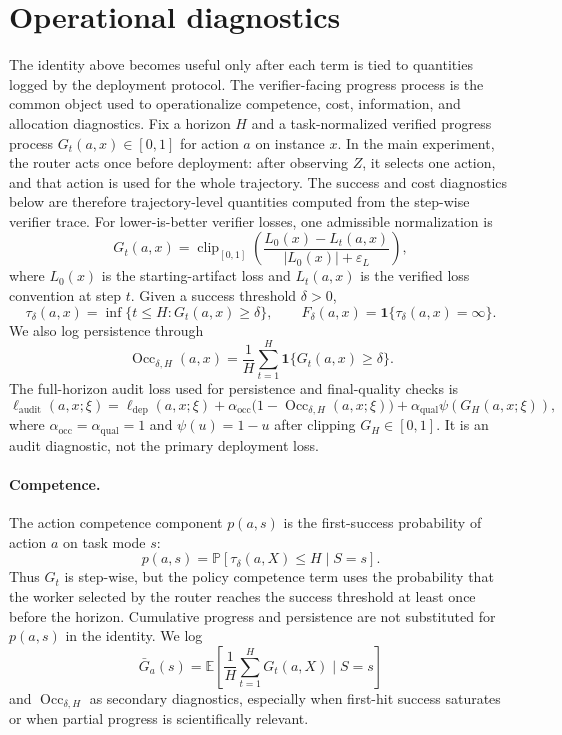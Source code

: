 \documentclass{article}
\DeclareMathOperator{\Occ}{Occ}
\newcommand{\E}{\mathbb{E}}
\newcommand{\Prb}{\mathbb{P}}
\newcommand{\eps}{\varepsilon}
\newcommand{\one}{\mathbf{1}}
\begin{document}
\section{Operational diagnostics}
\label{subsec:bridge}

The identity above becomes useful only after each term is tied to quantities logged by the deployment protocol.
The verifier-facing progress process is the common object used to operationalize competence, cost, information, and allocation diagnostics.
Fix a horizon $H$ and a task-normalized verified progress process $G_t(a,x)\in[0,1]$ for action $a$ on instance $x$.
In the main experiment, the router acts once before deployment: after observing $Z$, it selects one action, and that action is used for the whole trajectory.
The success and cost diagnostics below are therefore trajectory-level quantities computed from the step-wise verifier trace.
For lower-is-better verifier losses, one admissible normalization is
\[
G_t(a,x)
=
\operatorname{clip}_{[0,1]}\!\left(
\frac{L_0(x)-L_t(a,x)}{|L_0(x)|+\eps_L}
\right),
\]
where $L_0(x)$ is the starting-artifact loss and $L_t(a,x)$ is the verified loss convention at step $t$.
Given a success threshold $\delta>0$,
\[
\tau_\delta(a,x)=\inf\{t\le H:G_t(a,x)\ge \delta\},
\qquad
F_\delta(a,x)=\one\{\tau_\delta(a,x)=\infty\}.
\]
We also log persistence through
\[
\Occ_{\delta,H}(a,x)=\frac{1}{H}\sum_{t=1}^H \one\{G_t(a,x)\ge \delta\}.
\]
The full-horizon audit loss used for persistence and final-quality checks is
\begin{equation}
\ell_{\mathrm{audit}}(a,x;\xi)
=
\ell_{\mathrm{dep}}(a,x;\xi)
+\alpha_{\mathrm{occ}}\bigl(1-\Occ_{\delta,H}(a,x;\xi)\bigr)
+\alpha_{\mathrm{qual}}\psi(G_H(a,x;\xi)),
\label{eq:audit-loss}
\end{equation}
where \(\alpha_{\mathrm{occ}}=\alpha_{\mathrm{qual}}=1\) and \(\psi(u)=1-u\) after clipping \(G_H\in[0,1]\).
It is an audit diagnostic, not the primary deployment loss.

\paragraph{Competence.}
The action competence component $p(a,s)$ is the first-success probability of action $a$ on task mode $s$:
\[
p(a,s)=\Prb[\tau_\delta(a,X)\le H\mid S=s].
\]
Thus $G_t$ is step-wise, but the policy competence term uses the probability that the worker selected by the router reaches the success threshold at least once before the horizon.
Cumulative progress and persistence are not substituted for $p(a,s)$ in the identity.
We log
\[
\bar G_a(s)=\E\!\left[\frac{1}{H}\sum_{t=1}^H G_t(a,X)\mid S=s\right]
\]
and $\Occ_{\delta,H}$ as secondary diagnostics, especially when first-hit success saturates or when partial progress is scientifically relevant.
\end{document}
